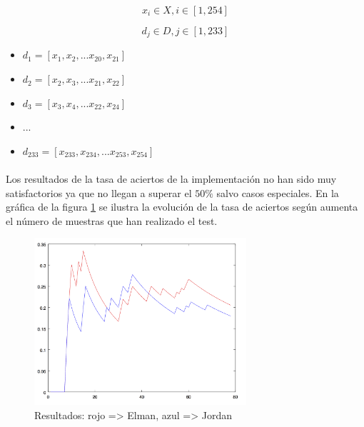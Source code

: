 \documentclass[10pt, a4paper,spanish]{article}
\begin{document}
		\begin{equation}
			x_i \in X, i \in [1,254]
		\end{equation}

		\begin{equation}
			d_j \in D, j \in [1,233]
		\end{equation}

		\begin{itemize}
			\item $d_{1} = [x_{1},x_{2},...x_{20},x_{21}]$
			\item $d_{2} = [x_{2},x_{3},...x_{21},x_{22}]$
			\item $d_{3} = [x_{3},x_{4},...x_{22},x_{24}]$
			\item $...$
			\item $d_{233} = [x_{233},x_{234},...x_{253},x_{254}]$
		\end{itemize}


		\paragraph{}
		Los resultados de la tasa de aciertos de la implementación no han sido muy satisfactorios ya que no llegan a superar el $50\%$ salvo casos especiales. En la gráfica de la figura \ref{plot:results} se ilustra la evolución de la tasa de aciertos según aumenta el número de muestras que han realizado el test.


		\begin{figure}[H]
			\begin{center}
				\includegraphics[width=0.7\textwidth]{chart}
				\caption{Resultados: rojo => Elman, azul => Jordan}
				\label{plot:results}
			\end{center}
		\end{figure}

		\paragraph{}
\end{document}
